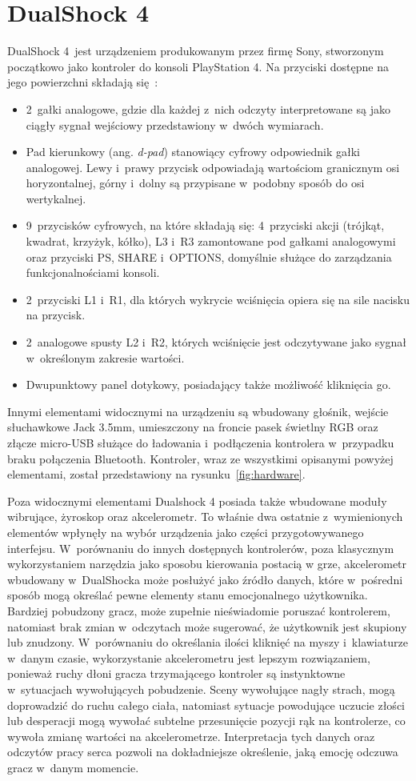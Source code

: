 \section{DualShock 4}
DualShock 4~jest urządzeniem produkowanym przez firmę Sony, stworzonym początkowo jako kontroler do konsoli PlayStation 4. Na przyciski dostępne na jego powierzchni składają się~\cite{dualshock_specification}:
\begin{itemize}
	\item 2~gałki analogowe, gdzie dla każdej z~nich odczyty interpretowane są jako ciągły sygnał wejściowy przedstawiony w~dwóch wymiarach.
	\item Pad kierunkowy (ang. \textit{d-pad}) stanowiący cyfrowy odpowiednik gałki analogowej. Lewy i~prawy przycisk odpowiadają wartościom granicznym osi horyzontalnej, górny i~dolny są przypisane w~podobny sposób do osi wertykalnej.
	\item 9~przycisków cyfrowych, na które składają się: 4~przyciski akcji (trójkąt, kwadrat, krzyżyk, kółko), L3 i~R3 zamontowane pod gałkami analogowymi oraz przyciski PS, SHARE i~OPTIONS, domyślnie służące do zarządzania funkcjonalnościami konsoli.
	\item 2~przyciski L1 i~R1, dla których wykrycie wciśnięcia opiera się na sile nacisku na przycisk.
	\item 2~analogowe spusty L2 i~R2, których wciśnięcie jest odczytywane jako sygnał w~określonym zakresie wartości.
	\item Dwupunktowy panel dotykowy, posiadający także możliwość kliknięcia go.
\end{itemize}
Innymi elementami widocznymi na urządzeniu są wbudowany głośnik, wejście słuchawkowe Jack 3.5mm, umieszczony na froncie pasek świetlny RGB oraz złącze micro-USB służące do ładowania i~podłączenia kontrolera w~przypadku braku połączenia Bluetooth. Kontroler, wraz ze wszystkimi opisanymi powyżej elementami, został przedstawiony na rysunku~\ref{fig:hardware}.

Poza widocznymi elementami Dualshock 4 posiada także wbudowane moduły wibrujące, żyroskop oraz akcelerometr. To właśnie dwa ostatnie z~wymienionych elementów wpłynęły na wybór urządzenia jako części przygotowywanego interfejsu. W~porównaniu do innych dostępnych kontrolerów, poza klasycznym wykorzystaniem narzędzia jako sposobu kierowania postacią w grze, akcelerometr wbudowany w~DualShocka może posłużyć jako źródło danych, które w~pośredni sposób mogą określać pewne elementy stanu emocjonalnego użytkownika. Bardziej pobudzony gracz, może zupełnie nieświadomie poruszać kontrolerem, natomiast brak zmian w~odczytach może sugerować, że użytkownik jest skupiony lub znudzony. W~porównaniu do określania ilości kliknięć na myszy i~klawiaturze w~danym czasie, wykorzystanie akcelerometru jest lepszym rozwiązaniem, ponieważ ruchy dłoni gracza trzymającego kontroler są instynktowne w~sytuacjach wywołujących pobudzenie. Sceny wywołujące nagły strach, mogą doprowadzić do ruchu całego ciała, natomiast sytuacje powodujące uczucie złości lub desperacji mogą wywołać subtelne przesunięcie pozycji rąk na kontrolerze, co wywoła zmianę wartości na akcelerometrze. Interpretacja tych danych oraz odczytów pracy serca pozwoli na dokładniejsze określenie, jaką emocję odczuwa gracz w~danym momencie.

